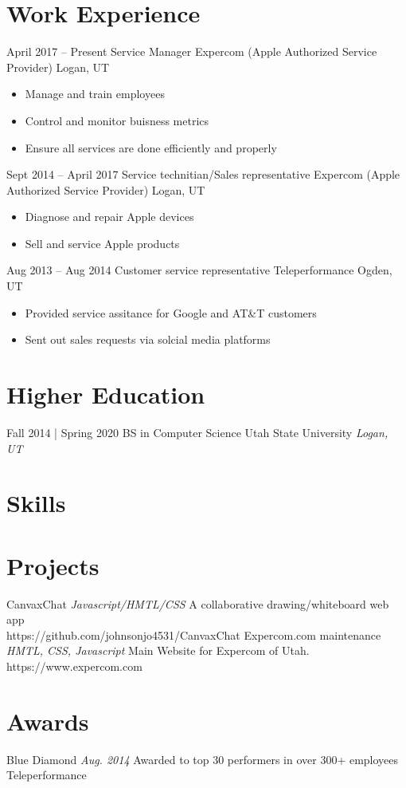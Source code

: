 \documentclass[letterpaper]{moderncv}        %
\begin{document}
\makecvtitle
    

\section{Work Experience}
\cventry
{April 2017 -- Present}
{Service Manager}
{Expercom (Apple Authorized Service Provider)}
{Logan, UT}
{}
{\begin{itemize}%
	\item Manage and train employees
	\item Control and monitor buisness metrics
	\item Ensure all services are done efficiently and properly
	\end{itemize}}
\cventry
{Sept 2014 -- April 2017}
{Service technitian/Sales representative}
{Expercom (Apple Authorized Service Provider)}
{Logan, UT}
{}
{\begin{itemize}%
	\item Diagnose and repair Apple devices
	\item Sell and service Apple products
	\end{itemize}}
\cventry
{Aug 2013 -- Aug 2014}
{Customer service representative}
{Teleperformance}
{Ogden, UT}
{}
{\begin{itemize}%
	\item Provided service assitance for Google and AT\&T customers
	\item Sent out sales requests via solcial media platforms
	\end{itemize}}
\section{Higher Education}
\cventry
{Fall 2014 | Spring 2020}
{BS in Computer Science}
{Utah State University}
{}
{\textit{Logan, UT}}
{}
\section{Skills}
\section{Projects}
\cventry
{}
{CanvaxChat}
{}
{\textit{Javascript/HMTL/CSS}}
{}
{A collaborative drawing/whiteboard web app\\https://github.com/johnsonjo4531/CanvaxChat}
\vspace{1mm}
\cventry
{}
{Expercom.com maintenance}
{}
{\textit{HMTL, CSS, Javascript}}
{}
{Main Website for Expercom of Utah.\\https://www.expercom.com}
\vspace{1mm}
\section{Awards}
\cventry
{}
{Blue Diamond}
{}
{\textit{Aug. 2014}}
{}
{Awarded to top 30 performers in over 300+ employees\\Teleperformance}
\vspace{1mm}
\ 
\end{document}
